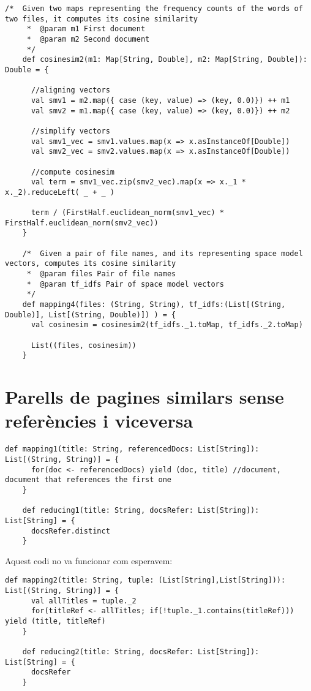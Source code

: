 \documentclass{report}
\begin{document}
\begin{lstlisting}[style=scalaHighlight]
/*  Given two maps representing the frequency counts of the words of two files, it computes its cosine similarity
     *  @param m1 First document
     *  @param m2 Second document
     */
    def cosinesim2(m1: Map[String, Double], m2: Map[String, Double]): Double = {

      //aligning vectors
      val smv1 = m2.map({ case (key, value) => (key, 0.0)}) ++ m1
      val smv2 = m1.map({ case (key, value) => (key, 0.0)}) ++ m2

      //simplify vectors
      val smv1_vec = smv1.values.map(x => x.asInstanceOf[Double])
      val smv2_vec = smv2.values.map(x => x.asInstanceOf[Double])

      //compute cosinesim
      val term = smv1_vec.zip(smv2_vec).map(x => x._1 * x._2).reduceLeft( _ + _ )

      term / (FirstHalf.euclidean_norm(smv1_vec) * FirstHalf.euclidean_norm(smv2_vec))
    }

    /*  Given a pair of file names, and its representing space model vectors, computes its cosine similarity
     *  @param files Pair of file names
     *  @param tf_idfs Pair of space model vectors
     */
    def mapping4(files: (String, String), tf_idfs:(List[(String, Double)], List[(String, Double)]) ) = {
      val cosinesim = cosinesim2(tf_idfs._1.toMap, tf_idfs._2.toMap)

      List((files, cosinesim))
    }
\end{lstlisting}

\section{Parells de pagines similars sense referències i viceversa}

\begin{lstlisting}[style=scalaHighlight]
    def mapping1(title: String, referencedDocs: List[String]): List[(String, String)] = {
      for(doc <- referencedDocs) yield (doc, title) //document, document that references the first one
    }

    def reducing1(title: String, docsRefer: List[String]): List[String] = {
      docsRefer.distinct
    }
\end{lstlisting}

Aquest codi no va funcionar com esperavem:
\begin{lstlisting}[style=scalaHighlight]
    def mapping2(title: String, tuple: (List[String],List[String])): List[(String, String)] = {
      val allTitles = tuple._2
      for(titleRef <- allTitles; if(!tuple._1.contains(titleRef))) yield (title, titleRef)
    }

    def reducing2(title: String, docsRefer: List[String]): List[String] = {
      docsRefer
    }
\end{lstlisting}
\end{document}
